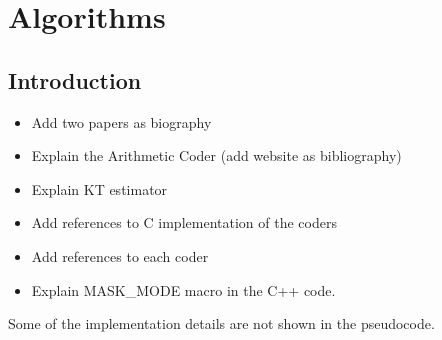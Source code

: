 
\chapter{Algorithms} %

\label{algo} %


\section{Introduction}
\label{algo:intro}
\begin{itemize}
    \item Add two papers as biography
    \item Explain the Arithmetic Coder (add website as bibliography) 
    \item Explain KT estimator 
    \item Add references to C implementation of the coders
    \item Add references to each coder
    \item Explain MASK\_MODE macro in the C++ code.
\end{itemize}

Some of the implementation details are not shown in the pseudocode.












